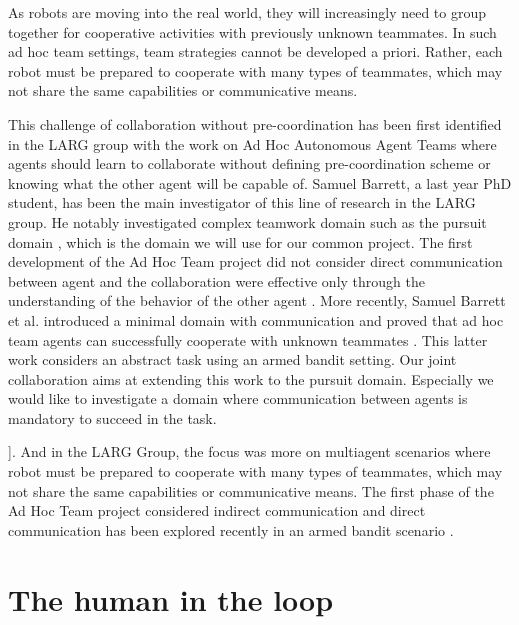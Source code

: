 As robots are moving into the real world, they will increasingly need to group together for cooperative activities with previously unknown teammates. In such ad hoc team settings, team strategies cannot be developed a priori. Rather, each robot must be prepared to cooperate with many types of teammates, which may not share the same capabilities or communicative means. 

This challenge of collaboration without pre-coordination has been first identified in the LARG group with the work on Ad Hoc Autonomous Agent Teams \cite{stone2010ad} where agents should learn to collaborate without defining pre-coordination scheme or knowing what the other agent will be capable of. Samuel Barrett, a last year PhD student, has been the main investigator of this line of research in the LARG group. He notably investigated complex teamwork domain such as the pursuit domain \cite{barrett2011empirical}, which is the domain we will use for our common project. The first development of the Ad Hoc Team project did not consider direct communication between agent \cite{stone2010ad} \cite{barrett2011adhoc} and the collaboration were effective only through the understanding of the behavior of the other agent \cite{barrett2011empirical} \cite{barrett2013team}. More recently, Samuel Barrett et al. introduced a minimal domain with communication and proved that ad hoc team agents can successfully cooperate with unknown teammates \cite{barrett2013communicating}. This latter work considers an abstract task using an armed bandit setting. Our joint collaboration aims at extending this work to the pursuit domain. Especially we would like to investigate a domain where communication between agents is mandatory to succeed in the task. 

]. And in the LARG Group, the focus was more on multiagent scenarios where robot must be prepared to cooperate with many types of teammates, which may not share the same capabilities or communicative means. The first phase of the Ad Hoc Team project considered indirect communication \cite{stone2010ad} \cite{barrett2011empirical} \cite{barrett2011adhoc} \cite{barrett2013team} and direct communication has been explored recently in an armed bandit scenario \cite{barrett2013communicating}.

\section{The human in the loop}
\label{chapter:related:humanintheloop}


